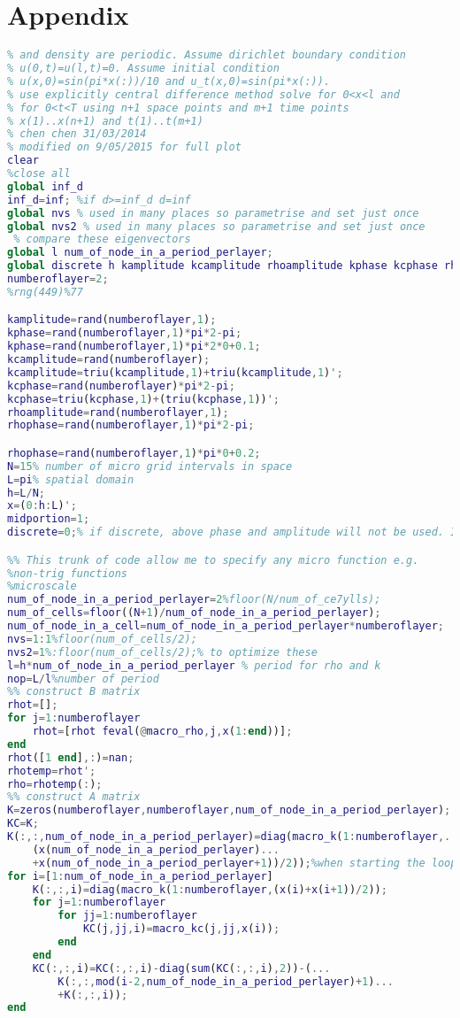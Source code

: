 \appendix
\section{Appendix}
\begin{lstlisting}[language=Matlab,caption=The Levenberg--Marquardt algorithm iteratively finds optimal macroscale Robin boundary conditions., label=matn1]
% solution of two layer periodic wave equation where both spring constant
% and density are periodic. Assume dirichlet boundary condition
% u(0,t)=u(l,t)=0. Assume initial condition
% u(x,0)=sin(pi*x(:))/10 and u_t(x,0)=sin(pi*x(:)).
% use explicitly central difference method solve for 0<x<l and
% for 0<t<T using n+1 space points and m+1 time points
% x(1)..x(n+1) and t(1)..t(m+1)
% chen chen 31/03/2014
% modified on 9/05/2015 for full plot
clear
%close all
global inf_d
inf_d=inf; %if d>=inf_d d=inf
global nvs % used in many places so parametrise and set just once
global nvs2 % used in many places so parametrise and set just once
 % compare these eigenvectors
global l num_of_node_in_a_period_perlayer;
global discrete h kamplitude kcamplitude rhoamplitude kphase kcphase rhophase numberoflayer;
numberoflayer=2;
%rng(449)%77

kamplitude=rand(numberoflayer,1);
kphase=rand(numberoflayer,1)*pi*2-pi;
kphase=rand(numberoflayer,1)*pi*2*0+0.1;
kcamplitude=rand(numberoflayer);
kcamplitude=triu(kcamplitude,1)+triu(kcamplitude,1)';
kcphase=rand(numberoflayer)*pi*2-pi;
kcphase=triu(kcphase,1)+(triu(kcphase,1))';
rhoamplitude=rand(numberoflayer,1);
rhophase=rand(numberoflayer,1)*pi*2-pi;

rhophase=rand(numberoflayer,1)*pi*0+0.2;
N=15% number of micro grid intervals in space
L=pi% spatial domain
h=L/N;
x=(0:h:L)';
midportion=1;
discrete=0;% if discrete, above phase and amplitude will not be used. Instead, specify the density and elasticities in files macro_rho, macro_kc and macro_k

%% This trunk of code allow me to specify any micro function e.g.
%non-trig functions
%microscale
num_of_node_in_a_period_perlayer=2%floor(N/num_of_ce7ylls);
num_of_cells=floor((N+1)/num_of_node_in_a_period_perlayer);
num_of_node_in_a_cell=num_of_node_in_a_period_perlayer*numberoflayer;
nvs=1:1%floor(num_of_cells/2);
nvs2=1%:floor(num_of_cells/2);% to optimize these
l=h*num_of_node_in_a_period_perlayer % period for rho and k
nop=L/l%number of period
%% construct B matrix
rhot=[];
for j=1:numberoflayer
    rhot=[rhot feval(@macro_rho,j,x(1:end))];
end
rhot([1 end],:)=nan;
rhotemp=rhot';
rho=rhotemp(:);
%% construct A matrix
K=zeros(numberoflayer,numberoflayer,num_of_node_in_a_period_perlayer);
KC=K;
K(:,:,num_of_node_in_a_period_perlayer)=diag(macro_k(1:numberoflayer,...
    (x(num_of_node_in_a_period_perlayer)...
    +x(num_of_node_in_a_period_perlayer+1))/2));%when starting the loop we need information about the lateral end spring
for i=[1:num_of_node_in_a_period_perlayer]
    K(:,:,i)=diag(macro_k(1:numberoflayer,(x(i)+x(i+1))/2));
    for j=1:numberoflayer
        for jj=1:numberoflayer
            KC(j,jj,i)=macro_kc(j,jj,x(i));
        end
    end
    KC(:,:,i)=KC(:,:,i)-diag(sum(KC(:,:,i),2))-(...
        K(:,:,mod(i-2,num_of_node_in_a_period_perlayer)+1)...
        +K(:,:,i));
end



\end{lstlisting}
